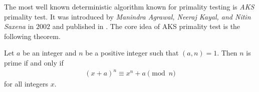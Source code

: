 %
The most well known deterministic algorithm known for primality testing is \textit{AKS} primality test. It was introduced by \textit{Manindra Agrawal, Neeraj Kayal, and Nitin Saxena} in $2002$ and published in \textcite{agrawal_kayal_saxena_2004}. The core idea of AKS primality test is the following theorem.
	\begin{theorem}
		Let $a$ be an integer and $n$ be a positive integer such that $(a,n)=1$. Then $n$ is prime if and only if
			\begin{align*}
				(x+a)^n \equiv x^n + a \pmod n
			\end{align*}
		for all integers $x$.
	\end{theorem}

